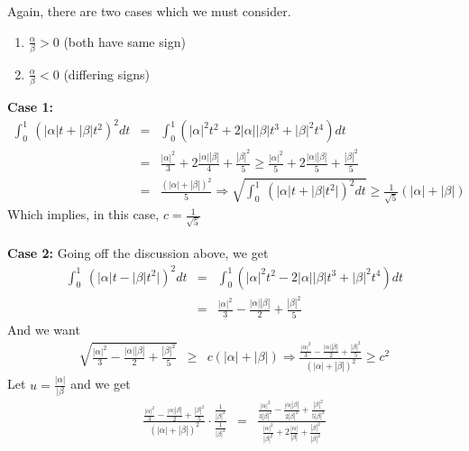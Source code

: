 \documentclass[11pt]{SelfArxOneColBMN}
\begin{document}
\begin{solution}
  \noindent Again, there are two cases which we must consider.
  \begin{enumerate}
    \item $\frac{\alpha}{\beta} > 0$ (both have same sign)
    \item $\frac{\alpha}{\beta} < 0$ (differing signs)
  \end{enumerate}
  \textbf{Case 1:}\\
  \begin{eqnarray*}
    \int_0^1 \: ( |\alpha| t + |\beta| t^2)^2 dt
    &=&
    \int_0^1 ( |\alpha|^2 t^2 + 2 |\alpha| |\beta| t^3 + |\beta|^2 t^4 ) dt\\
    &=&
    \frac{|\alpha|^2}{3} + 2\frac{|\alpha| |\beta|}{4} + \frac{|\beta|^2}{5}
    \geq
    \frac{|\alpha|^2}{5} + 2\frac{|\alpha| |\beta|}{5} + \frac{|\beta|^2}{5}\\
    &=&
    \frac{\left( |\alpha| + |\beta| \right)^2}{5}
    \Longrightarrow
    \sqrt{\int_0^1 \: ( |\alpha| t + |\beta| t^2|)^2 dt}
    \geq \frac{1}{\sqrt{5}} ( |\alpha| + |\beta|)
  \end{eqnarray*}
  Which implies, in this case, $c = \frac{1}{\sqrt{5}}$\\
  \\
  \textbf{Case 2: }
  Going off the discussion above, we get
  \begin{eqnarray*}
    \int_0^1 \: ( |\alpha| t - |\beta| t^2|)^2 dt 
    &=&
    \int_0^1 ( |\alpha|^2 t^2 - 2 |\alpha| |\beta| t^3 + |\beta|^2 t^4 ) dt\\
    &=&
    \frac{|\alpha|^2}{3} - \frac{|\alpha| |\beta|}{2 } + \frac{|\beta|^2}{5}
  \end{eqnarray*}
  And we want\\
  \begin{eqnarray*}
  \sqrt{\frac{|\alpha|^2}{3} - \frac{|\alpha| |\beta|}{2 } + \frac{|\beta|^2}{5}}
  &\geq& c (|\alpha| + |\beta|)
  \Longrightarrow
  \frac{\frac{|\alpha|^2}{3} - \frac{|\alpha| |\beta|}{2 } + \frac{|\beta|^2}{5}}{(|\alpha| + |\beta|)^2}
  \geq c^2
  \end{eqnarray*}
  Let $u = \frac{|\alpha|}{|\beta}$ and we get 
  \begin{eqnarray*}
  \frac{\frac{|\alpha|^2}{3} - \frac{|\alpha| |\beta|}{2 } + \frac{|\beta|^2}{5}}{(|\alpha| + |\beta|)^2} \cdot \frac{\frac{1}{|\beta|^2}}{\frac{1}{|\beta|^2}}
  &=&
  \frac{\frac{|\alpha|^2}{3|\beta|^2} - \frac{|\alpha||\beta|}{2|\beta|^2} + \frac{|\beta|^2}{5|\beta|^2}}{\frac{|\alpha|^2}{|\beta|^2} + 2\frac{|\alpha|}{|\beta|} + \frac{|\beta|^2}{|\beta|^2}}\\

\end{eqnarray*}
\end{solution}
\end{document}
